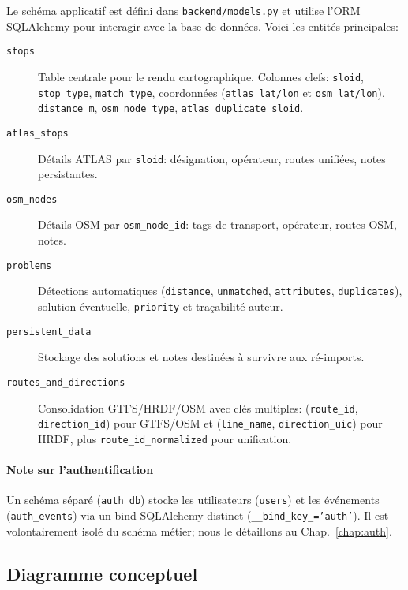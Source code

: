 Le schéma applicatif est défini dans \texttt{backend/models.py} et utilise l'ORM SQLAlchemy pour interagir avec la base de données. Voici les entités principales:

\begin{description}
  \item[\texttt{stops}] Table centrale pour le rendu cartographique. Colonnes clefs: \texttt{sloid}, \texttt{stop\_type}, \texttt{match\_type}, coordonnées (\texttt{atlas\_lat/lon} et \texttt{osm\_lat/lon}), \texttt{distance\_m}, \texttt{osm\_node\_type}, \texttt{atlas\_duplicate\_sloid}.
  
  \item[\texttt{atlas\_stops}] Détails ATLAS par \texttt{sloid}: désignation, opérateur, routes unifiées, notes persistantes.
  
  \item[\texttt{osm\_nodes}] Détails OSM par \texttt{osm\_node\_id}: tags de transport, opérateur, routes OSM, notes.
  
  \item[\texttt{problems}] Détections automatiques (\texttt{distance}, \texttt{unmatched}, \texttt{attributes}, \texttt{duplicates}), solution éventuelle, \texttt{priority} et traçabilité auteur.
  
  \item[\texttt{persistent\_data}] Stockage des solutions et notes destinées à survivre aux ré-imports.
  
  \item[\texttt{routes\_and\_directions}] Consolidation GTFS/HRDF/OSM avec clés multiples: (\texttt{route\_id}, \texttt{direction\_id}) pour GTFS/OSM et (\texttt{line\_name}, \texttt{direction\_uic}) pour HRDF, plus \texttt{route\_id\_normalized} pour unification.
\end{description}

\paragraph{Note sur l'authentification} Un schéma séparé (\texttt{auth\_db}) stocke les utilisateurs (\texttt{users}) et les événements (\texttt{auth\_events}) via un bind SQLAlchemy distinct (\texttt{\_\_bind\_key\_='auth'}). Il est volontairement isolé du schéma métier; nous le détaillons au Chap.~\ref{chap:auth}.

\subsection*{Diagramme conceptuel}

